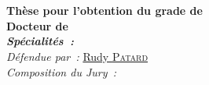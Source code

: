\begin{titlepage}
{%
   }\\[0.1cm] %
  \HRule \\[0.3cm]
  { %
  \bfseries
	Thèse pour l'obtention du grade de\\
	Docteur de \\%
	\emph{Spécialités~:}\\
	}
\emph{Défendue par~:} %
\href{mailto:rudy.patard@gmail.com}{Rudy \textsc{Patard}}\\ %
  \emph{Composition du Jury~:}\\[0.2cm]

\end{titlepage}